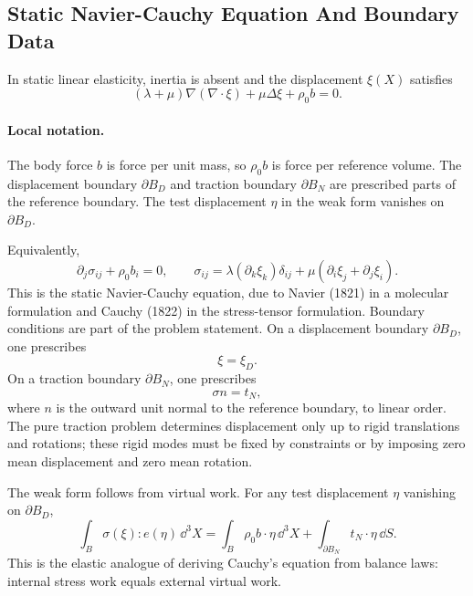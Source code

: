 \subsection{Static Navier-Cauchy Equation And Boundary Data}
\label{subsec:static-navier-cauchy}

In static linear elasticity, inertia is absent and the displacement
\(\xi(X)\) satisfies
\[
  \boxed{
  (\lambda+\mu)\nabla(\nabla\cdot\xi)+\mu\Delta\xi+\rho_0 b=0.
  }
\]

\paragraph{Local notation.}
The body force \(b\) is force per unit mass, so \(\rho_0 b\) is force per
reference volume.  The displacement boundary \(\partial B_D\) and traction
boundary \(\partial B_N\) are prescribed parts of the reference boundary.  The
test displacement \(\eta\) in the weak form vanishes on \(\partial B_D\).

Equivalently,
\[
  \partial_j\sigma_{ij}+\rho_0b_i=0,
  \qquad
  \sigma_{ij}=\lambda(\partial_k\xi_k)\delta_{ij}
  +\mu(\partial_i\xi_j+\partial_j\xi_i).
\]
This is the static Navier-Cauchy equation, due to Navier (1821) in a molecular
formulation and Cauchy (1822) in the stress-tensor formulation.
Boundary conditions are part of the problem statement. On a displacement
boundary \(\partial B_D\), one prescribes
\[
  \xi=\xi_D.
\]
On a traction boundary \(\partial B_N\), one prescribes
\[
  \sigma n=t_N,
\]
where \(n\) is the outward unit normal to the reference boundary, to linear
order. The pure traction problem determines displacement only up to rigid
translations and rotations; these rigid modes must be fixed by constraints or
by imposing zero mean displacement and zero mean rotation.

The weak form follows from virtual work. For any test displacement \(\eta\)
vanishing on \(\partial B_D\),
\[
  \int_B \sigma(\xi):e(\eta)\,\dd^3X
  =
  \int_B \rho_0 b\cdot\eta\,\dd^3X
  +
  \int_{\partial B_N} t_N\cdot\eta\,\dd S.
\]
This is the elastic analogue of deriving Cauchy's equation from balance laws:
internal stress work equals external virtual work.

